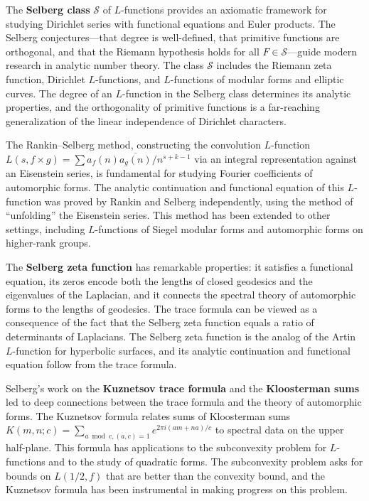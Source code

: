 The \textbf{Selberg class} $\mathcal{S}$ of $L$-functions provides an axiomatic framework for studying Dirichlet series with functional equations and Euler products. The Selberg conjectures---that degree is well-defined, that primitive functions are orthogonal, and that the Riemann hypothesis holds for all $F \in \mathcal{S}$---guide modern research in analytic number theory. The class $\mathcal{S}$ includes the Riemann zeta function, Dirichlet $L$-functions, and $L$-functions of modular forms and elliptic curves. The degree of an $L$-function in the Selberg class determines its analytic properties, and the orthogonality of primitive functions is a far-reaching generalization of the linear independence of Dirichlet characters.

The Rankin--Selberg method, constructing the convolution $L$-function $L(s, f \times g) = \sum a_f(n)\overline{a_g(n)} / n^{s+k-1}$ via an integral representation against an Eisenstein series, is fundamental for studying Fourier coefficients of automorphic forms. The analytic continuation and functional equation of this $L$-function was proved by Rankin and Selberg independently, using the method of ``unfolding'' the Eisenstein series. This method has been extended to other settings, including $L$-functions of Siegel modular forms and automorphic forms on higher-rank groups.

The \textbf{Selberg zeta function} has remarkable properties: it satisfies a functional equation, its zeros encode both the lengths of closed geodesics and the eigenvalues of the Laplacian, and it connects the spectral theory of automorphic forms to the lengths of geodesics. The trace formula can be viewed as a consequence of the fact that the Selberg zeta function equals a ratio of determinants of Laplacians. The Selberg zeta function is the analog of the Artin $L$-function for hyperbolic surfaces, and its analytic continuation and functional equation follow from the trace formula.

Selberg's work on the \textbf{Kuznetsov trace formula} and the \textbf{Kloosterman sums} led to deep connections between the trace formula and the theory of automorphic forms. The Kuznetsov formula relates sums of Kloosterman sums $K(m, n; c) = \sum_{a \bmod c, (a,c)=1} e^{2\pi i (am+na)/c}$ to spectral data on the upper half-plane. This formula has applications to the subconvexity problem for $L$-functions and to the study of quadratic forms. The subconvexity problem asks for bounds on $L(1/2, f)$ that are better than the convexity bound, and the Kuznetsov formula has been instrumental in making progress on this problem.

